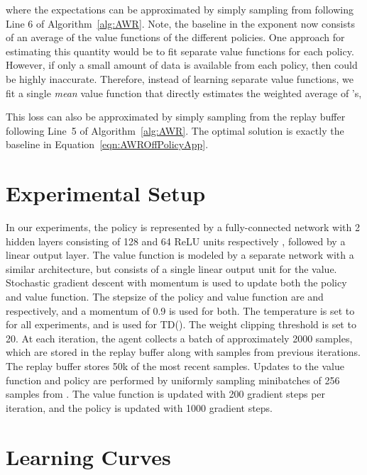 \documentclass{article} \usepackage{iclr2020_conference,times}
\begin{document}
where the expectations can be approximated by simply sampling from  following Line 6 of Algorithm~\ref{alg:AWR}. Note, the baseline in the exponent now consists of an average of the value functions of the different policies. One approach for estimating this quantity would be to fit separate value functions  for each policy. However, if only a small amount of data is available from each policy, then  could be highly inaccurate. Therefore, instead of learning separate value functions, we fit a single \emph{mean} value function  that directly estimates the weighted average of 's,

This loss can also be approximated by simply sampling from the replay buffer following Line~5 of Algorithm~\ref{alg:AWR}. The optimal solution  is exactly the baseline in Equation~\ref{eqn:AWROffPolicyApp}.

\section{Experimental Setup}
\label{sec:ExpSetup}
In our experiments, the policy is represented by a fully-connected network with 2 hidden layers consisting of 128 and 64 ReLU units respectively \citep{NairRLU2010}, followed by a linear output layer. The value function is modeled by a separate network with a similar architecture, but consists of a single linear output unit for the value. Stochastic gradient descent with momentum is used to update both the policy and value function. The stepsize of the policy and value function are  and  respectively, and a momentum of 0.9 is used for both. The temperature is set to  for all experiments, and  is used for TD(). The weight clipping threshold  is set to 20. At each iteration, the agent collects a batch of approximately 2000 samples, which are stored in the replay buffer  along with samples from previous iterations. The replay buffer stores 50k of the most recent samples. Updates to the value function and policy are performed by uniformly sampling minibatches of 256 samples from . The value function is updated with 200 gradient steps per iteration, and the policy is updated with 1000 gradient steps.

\newpage
\section{Learning Curves}
\end{document}
